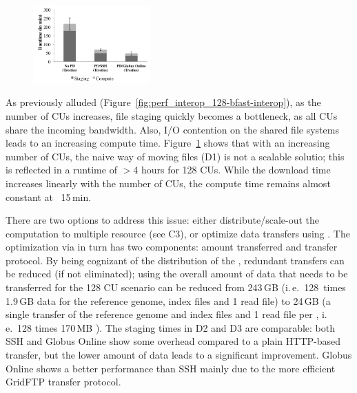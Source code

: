 \documentclass[conference]{IEEEtran}
\begin{document}
\begin{figure}[t]
	\upp
	\centering
		\includegraphics[width=0.4\textwidth]{../perf/sc/pd-128cus.pdf}
	\caption{}
	\label{fig:perf_sc_download-concurrent-cus}
\end{figure}

As previously alluded
(Figure~\ref{fig:perf_interop_128-bfast-interop}), as the number of
CUs increases, file staging quickly becomes a bottleneck, as all CUs
share the incoming bandwidth.  Also, I/O contention on the shared file
systems leads to an increasing compute time.
Figure~\ref{fig:perf_sc_download-concurrent-cus} shows that with an
increasing number of CUs, the naive way of moving files (D1) is not a
scalable solutio; this is reflected in a runtime of $>$4 hours for 128
CUs.  While the download time increases linearly with the number of
CUs, the compute time remains almost constant at ~15\,min.

There are two options to address this issue: either
distribute/scale-out the computation to multiple resource (see C3), or
optimize data transfers using \pilotdata.  The optimization via
\pilotdata in turn has two components: amount transferred and transfer
protocol.  By being cognizant of the distribution of the \cus,
redundant transfers can be reduced (if not eliminated); using
\pilotdata the overall amount of data that needs to be transferred for
the 128 CU scenario can be reduced from 243\,GB (i.\,e.\ 128\,\cus
times 1.9\,GB data for the reference genome, index files and 1 read
file) to 24\,GB (a single transfer of the reference genome and index
files and 1 read file per \cu, i.\,e.\ 128 times 170\,MB ).  The
staging times in D2 and D3 are comparable: both SSH and Globus Online
show some overhead compared to a plain HTTP-based transfer, but the
lower amount of data leads to a significant improvement.  Globus
Online shows a better performance than SSH mainly due to the more
efficient GridFTP transfer protocol.
\end{document}
